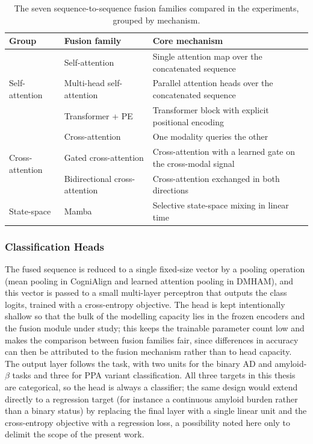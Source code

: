 \documentclass[a4paper,12pt]{article}
\begin{document}
\begin{table}[H]
\centering
\caption[Fusion families]{\footnotesize The seven sequence-to-sequence fusion families compared in the experiments, grouped by mechanism.}
\label{tab:fusion}
\footnotesize{
\begin{tabular}{@{}lll@{}}
\toprule
\textbf{Group} & \textbf{Fusion family} & \textbf{Core mechanism} \\ \midrule
\multirow{3}{*}{Self-attention} & Self-attention & Single attention map over the concatenated sequence \\
 & Multi-head self-attention & Parallel attention heads over the concatenated sequence \\
 & Transformer + PE & Transformer block with explicit positional encoding \\
\midrule
\multirow{3}{*}{Cross-attention} & Cross-attention & One modality queries the other \\
 & Gated cross-attention & Cross-attention with a learned gate on the cross-modal signal \\
 & Bidirectional cross-attention & Cross-attention exchanged in both directions \\
\midrule
State-space & Mamba & Selective state-space mixing in linear time \\
\bottomrule
\end{tabular}
}
\end{table}

\subsubsection{Classification Heads}

The fused sequence is reduced to a single fixed-size vector by a pooling operation (mean pooling in CogniAlign and learned attention pooling in DMHAM), and this vector is passed to a small multi-layer perceptron that outputs the class logits, trained with a cross-entropy objective. The head is kept intentionally shallow so that the bulk of the modelling capacity lies in the frozen encoders and the fusion module under study; this keeps the trainable parameter count low and makes the comparison between fusion families fair, since differences in accuracy can then be attributed to the fusion mechanism rather than to head capacity. The output layer follows the task, with two units for the binary AD and amyloid-$\beta$ tasks and three for PPA variant classification. All three targets in this thesis are categorical, so the head is always a classifier; the same design would extend directly to a regression target (for instance a continuous amyloid burden rather than a binary status) by replacing the final layer with a single linear unit and the cross-entropy objective with a regression loss, a possibility noted here only to delimit the scope of the present work.
\end{document}
